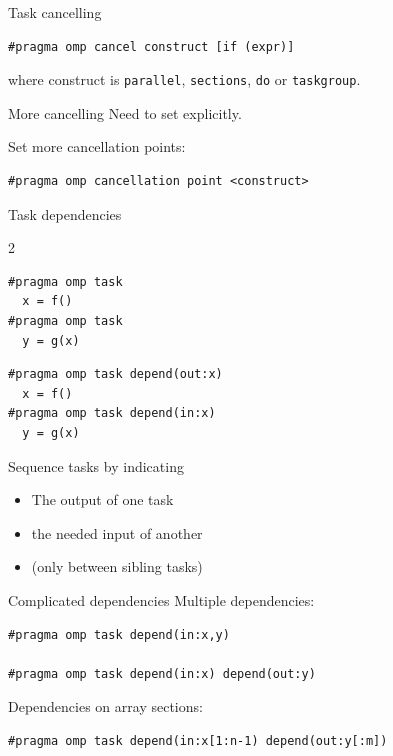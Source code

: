 \begin{numberedframe}{Task cancelling}
\begin{lstlisting}[numbers=none]
#pragma omp cancel construct [if (expr)]
\end{lstlisting}
where construct is
\lstinline{parallel},
\lstinline{sections},
\lstinline{do}
or
\lstinline{taskgroup}.
\end{numberedframe}

\begin{numberedframe}{More cancelling}
  Need to set   explicitly.

  Set more cancellation points:
\begin{lstlisting}[numbers=none]
#pragma omp cancellation point <construct>
\end{lstlisting}
\end{numberedframe}

\begin{numberedframe}{Task dependencies}
\begin{multicols}{2}
\begin{lstlisting}
#pragma omp task
  x = f()
#pragma omp task
  y = g(x)
\end{lstlisting}
\columnbreak
\footnotesize
\begin{lstlisting}
#pragma omp task depend(out:x)
  x = f()
#pragma omp task depend(in:x)
  y = g(x)
\end{lstlisting}
\end{multicols}

 Sequence tasks by indicating
  \begin{itemize}
  \item The output of one task
  \item the needed input of another
  \item (only between sibling tasks)
  \end{itemize}
\end{numberedframe}

\begin{numberedframe}{Complicated dependencies}
  Multiple dependencies:
\begin{lstlisting}
#pragma omp task depend(in:x,y)

#pragma omp task depend(in:x) depend(out:y)
\end{lstlisting}
Dependencies on array sections:
\begin{lstlisting}
#pragma omp task depend(in:x[1:n-1) depend(out:y[:m])
\end{lstlisting}
\end{numberedframe}

